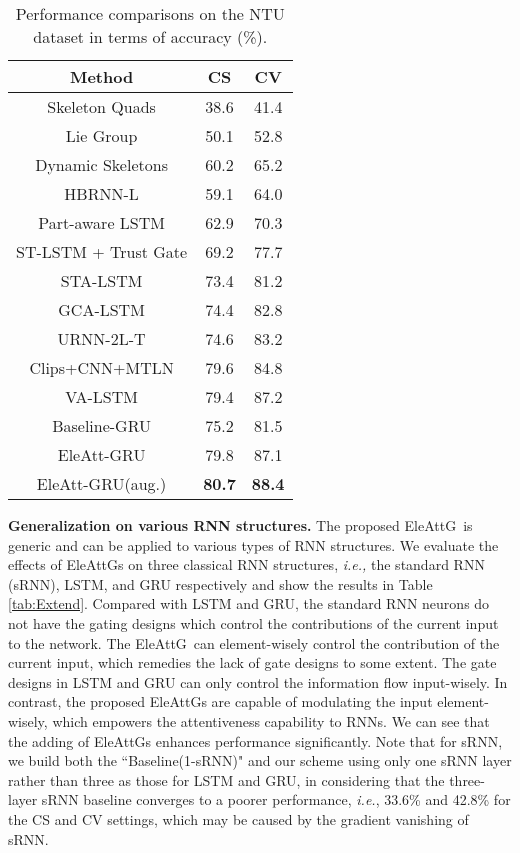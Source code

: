 \documentclass[journal]{IEEEtran}
\newcommand{\EleAttGn}{{EleAttG}}
\newcommand{\EleAttG}{{EleAttG~}}
\begin{document}
\setlength{\tabcolsep}{7pt}
\begin{table}[t]
	\centering
	\caption{Performance comparisons on the NTU dataset in terms of accuracy (\%).}
	\label{tab:ntu}
	\begin{tabular}{ccc}
		\toprule
		{Method}                                           & CS & CV \\
		\midrule
		{Skeleton Quads \cite{evangelidis2014skeletal}}  & 38.6     & 41.4  \\
		{Lie Group \cite{vemulapalli2014human}}          & 50.1     & 52.8  \\
		{Dynamic Skeletons  \cite{hu2015jointly}}        & 60.2    & 65.2  \\
		{HBRNN-L  \cite{du2015hierarchical}}             & 59.1     & 64.0  \\
		{Part-aware LSTM   \cite{Shahroudy_2016_CVPR}} & 62.9     & 70.3  \\
		{ST-LSTM + Trust Gate \cite{liu2016spatio}}      & 69.2     & 77.7  \\
		{STA-LSTM \cite{song2018spatio}}                    & 73.4     & 81.2  \\
		{GCA-LSTM \cite{liu2017global}}                  & 74.4     & 82.8  \\
		{URNN-2L-T \cite{li2017adaptive}}                & 74.6     & 83.2  \\
		{Clips+CNN+MTLN \cite{ke2017new}}                & 79.6     & 84.8  \\
		{VA-LSTM \cite{zhang2017view}}                   & 79.4     & 87.2  \\
		\midrule
		Baseline-GRU  & 75.2 & 81.5 \\
		EleAtt-GRU & 79.8  & 87.1 \\
		EleAtt-GRU(aug.)     & \textbf{80.7}    & \textbf{88.4} \\
		\bottomrule
	\end{tabular}
\end{table}

\textbf{Generalization on various RNN structures.} The proposed \EleAttG is generic and can be applied to various types of RNN structures. We evaluate the effects of {\EleAttGn}s on three classical RNN structures, {\it i.e.,} the standard RNN (sRNN), LSTM, and GRU respectively and show the results in Table \ref{tab:Extend}. Compared with LSTM and GRU, the standard RNN neurons do not have the gating designs which control the contributions of the current input to the network. The \EleAttG can element-wisely control the contribution of the current input, which remedies the lack of gate designs to some extent. The gate designs in LSTM and GRU can only control the information flow input-wisely. In contrast, the proposed {\EleAttGn}s are capable of modulating the input element-wisely, which empowers the attentiveness capability to RNNs. We can see that the adding of {\EleAttGn}s  enhances performance significantly. Note that for sRNN, we build both the ``Baseline(1-sRNN)" and our scheme using only one sRNN layer rather than three as those for LSTM and GRU, in considering that the three-layer sRNN baseline converges to a poorer performance, {\it i.e.}, 33.6\% and 42.8\% for the CS and CV settings, which may be caused by the gradient vanishing of sRNN. 
\end{document}

